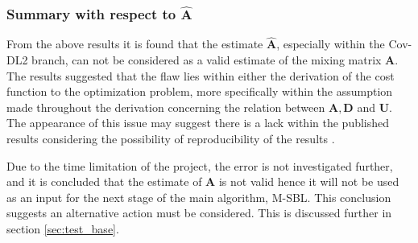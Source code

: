 \subsubsection{Summary with respect to $\hat{\mathbf{A}}$}
From the above results it is found that the estimate $\hat{\mathbf{A}}$, especially within the Cov-DL2 branch, can not be considered as a valid estimate of the mixing matrix $\mathbf{A}$. 
The results suggested that the flaw lies within either the derivation of the cost function to the optimization problem, more specifically within the assumption made throughout the derivation concerning the relation between $\mathbf{A}, \mathbf{D}$ and $\mathbf{U}$. 
The appearance of this issue may suggest there is a lack within the published results \cite{Balkan2015} considering the possibility of reproducibility of the results . 

Due to the time limitation of the project, the error is not investigated further, and it is concluded that the estimate of $\mathbf{A}$ is not valid hence it will not be used as an input for the next stage of the main algorithm, M-SBL. This conclusion suggests an alternative action must be considered. This is discussed further in section \ref{sec:test_base}.

